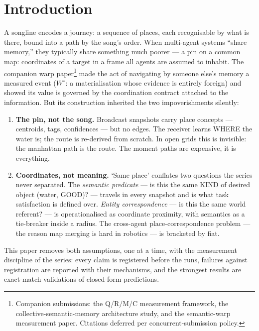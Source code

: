 \documentclass{article}
\newcommand{\wstar}{W^{\star}}
\begin{document}
\section{Introduction}
\label{sec:intro}

A songline encodes a journey: a sequence of places, each recognisable
by what is there, bound into a path by the song's order. When
multi-agent systems ``share memory,'' they typically share something
much poorer --- a pin on a common map: coordinates of a target in a
frame all agents are assumed to inhabit. The companion warp
paper\footnote{Companion submissions: the Q/R/M/C measurement
framework, the collective-semantic-memory architecture study, and the
semantic-warp measurement paper. Citations deferred per
concurrent-submission policy.} made the act of navigating by someone
else's memory a measured event ($\wstar$: a materialisation whose
evidence is entirely foreign) and showed its value is governed by the
coordination contract attached to the information. But its
construction inherited the two impoverishments silently:

\begin{enumerate}[leftmargin=20pt,itemsep=2pt,topsep=2pt]
\item \textbf{The pin, not the song.} Broadcast snapshots carry place
  concepts --- centroids, tags, confidences --- but no edges. The
  receiver learns WHERE the water is; the route is re-derived from
  scratch. In open grids this is invisible: the manhattan path is the
  route. The moment paths are expensive, it is everything.
\item \textbf{Coordinates, not meaning.} `Same place' conflates two
  questions the series never separated. The \emph{semantic predicate}
  --- is this the same KIND of desired object (water, GOOD)? ---
  travels in every snapshot and is what task satisfaction is defined
  over. \emph{Entity correspondence} --- is this the same world
  referent? --- is operationalised as coordinate proximity, with
  semantics as a tie-breaker inside a radius. The cross-agent
  place-correspondence problem --- the reason map merging is hard in
  robotics --- is bracketed by fiat.
\end{enumerate}

This paper removes both assumptions, one at a time, with the
measurement discipline of the series: every claim is registered before
the runs, failures against registration are reported with their
mechanisms, and the strongest results are exact-match validations of
closed-form predictions.
\end{document}
